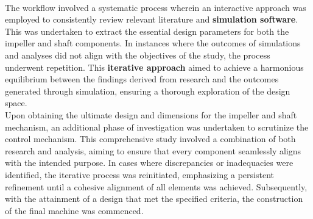 \documentclass[a4,10pt]{report}
\begin{document}
\vspace{2mm} \\
The workflow involved a systematic process wherein an interactive approach was employed to consistently review relevant literature and \textbf{simulation software}. This was undertaken to extract the essential design parameters for both the impeller and shaft components. In instances where the outcomes of simulations and analyses did not align with the objectives of the study, the process underwent repetition. This \textbf{iterative approach} aimed to achieve a harmonious equilibrium between the findings derived from research and the outcomes generated through simulation, ensuring a thorough exploration of the design space.
\vspace{2mm} \\
Upon obtaining the ultimate design and dimensions for the impeller and shaft mechanism, an additional phase of investigation was undertaken to scrutinize the control mechanism. This comprehensive study involved a combination of both research and analysis, aiming to ensure that every component seamlessly aligns with the intended purpose. In cases where discrepancies or inadequacies were identified, the iterative process was reinitiated, emphasizing a persistent refinement until a cohesive alignment of all elements was achieved. Subsequently, with the attainment of a design that met the specified criteria, the construction of the final machine was commenced.
\end{document}
